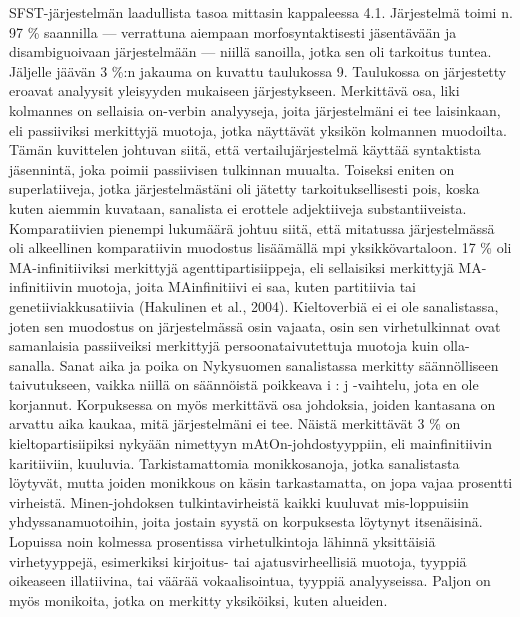 \documentclass[free]{flammie}
\begin{document}
SFST-järjestelmän laadullista tasoa mittasin kappaleessa 4.1. Järjestelmä toimi n.
97 \% saannilla — verrattuna aiempaan morfosyntaktisesti jäsentävään ja disambiguoivaan järjestelmään — niillä sanoilla, jotka sen oli tarkoitus tuntea. Jäljelle
jäävän 3 \%:n jakauma on kuvattu taulukossa 9. Taulukossa on järjestetty eroavat analyysit yleisyyden mukaiseen järjestykseen. Merkittävä osa, liki kolmannes
on sellaisia on-verbin analyyseja, joita järjestelmäni ei tee laisinkaan, eli passiiviksi merkittyjä muotoja, jotka näyttävät yksikön kolmannen muodoilta. Tämän
kuvittelen johtuvan siitä, että vertailujärjestelmä käyttää syntaktista jäsennintä,
joka poimii passiivisen tulkinnan muualta. Toiseksi eniten on superlatiiveja, jotka järjestelmästäni oli jätetty tarkoituksellisesti pois, koska kuten aiemmin kuvataan, sanalista ei erottele adjektiiveja substantiiveista. Komparatiivien pienempi
lukumäärä johtuu siitä, että mitatussa järjestelmässä oli alkeellinen komparatiivin
muodostus lisäämällä mpi yksikkövartaloon. 17 \% oli MA-infinitiiviksi merkittyjä
agenttipartisiippeja, eli sellaisiksi merkittyjä MA-infinitiivin muotoja, joita MAinfinitiivi ei saa, kuten partitiivia tai genetiiviakkusatiivia (Hakulinen et al., 2004).
Kieltoverbiä ei ei ole sanalistassa, joten sen muodostus on järjestelmässä osin vajaata, osin sen virhetulkinnat ovat samanlaisia passiiveiksi merkittyjä persoonataivutettuja muotoja kuin olla-sanalla. Sanat aika ja poika on Nykysuomen sanalistassa merkitty säännölliseen taivutukseen, vaikka niillä on säännöistä poikkeava i
: j -vaihtelu, jota en ole korjannut. Korpuksessa on myös merkittävä osa johdoksia,
joiden kantasana on arvattu aika kaukaa, mitä järjestelmäni ei tee. Näistä
merkittävät 3 \% on kieltopartisiipiksi nykyään nimettyyn mAtOn-johdostyyppiin, eli mainfinitiivin karitiiviin, kuuluvia. Tarkistamattomia monikkosanoja, jotka sanalistasta löytyvät, mutta joiden monikkous on käsin tarkastamatta, on jopa vajaa prosentti virheistä. Minen-johdoksen tulkintavirheistä kaikki kuuluvat mis-loppuisiin
yhdyssanamuotoihin, joita jostain syystä on korpuksesta löytynyt itsenäisinä. Lopuissa noin kolmessa prosentissa virhetulkintoja lähinnä yksittäisiä virhetyyppejä,
esimerkiksi kirjoitus- tai ajatusvirheellisiä muotoja, tyyppiä oikeaseen illatiivina,
tai väärää vokaalisointua, tyyppiä analyyseissa. Paljon on myös monikoita, jotka
on merkitty yksiköiksi, kuten alueiden.
\end{document}
